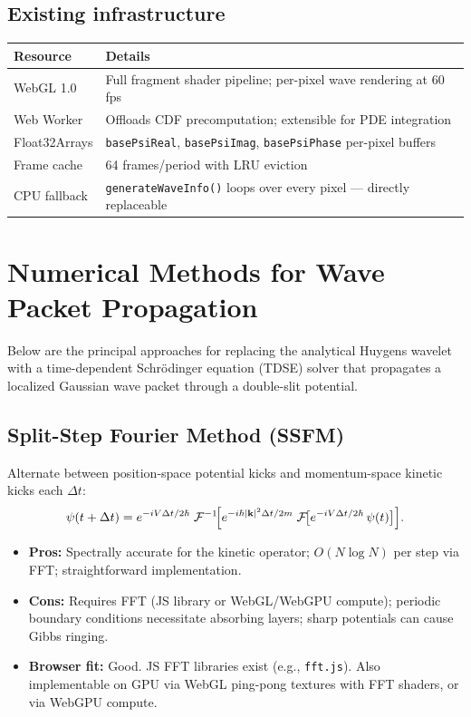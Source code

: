 \documentclass[11pt,a4paper]{article}
\begin{document}
\subsection{Existing infrastructure}
\begin{table}[h]
\centering
\begin{tabular}{@{}ll@{}}
\toprule
\textbf{Resource} & \textbf{Details} \\
\midrule
WebGL 1.0 & Full fragment shader pipeline; per-pixel wave rendering at 60\,fps \\
Web Worker & Offloads CDF precomputation; extensible for PDE integration \\
Float32Arrays & \texttt{basePsiReal}, \texttt{basePsiImag}, \texttt{basePsiPhase} per-pixel buffers \\
Frame cache & 64 frames/period with LRU eviction \\
CPU fallback & \texttt{generateWaveInfo()} loops over every pixel --- directly replaceable \\
\bottomrule
\end{tabular}
\end{table}


\section{Numerical Methods for Wave Packet Propagation}

Below are the principal approaches for replacing the analytical Huygens wavelet with a time-dependent Schr\"odinger equation (TDSE) solver that propagates a localized Gaussian wave packet through a double-slit potential.

\subsection{Split-Step Fourier Method (SSFM)}

Alternate between position-space potential kicks and momentum-space kinetic kicks each $\Delta t$:
\begin{equation}
  \psi(t + \Delta t)
  = e^{-iV\Delta t/2\hbar}\;
    \mathcal{F}^{-1}\!\Bigl[
      e^{-i\hbar|\mathbf{k}|^2\Delta t/2m}\;
      \mathcal{F}\!\bigl[
        e^{-iV\Delta t/2\hbar}\,\psi(t)
      \bigr]
    \Bigr].
\end{equation}

\begin{itemize}
  \item \textbf{Pros:} Spectrally accurate for the kinetic operator; $O(N\log N)$ per step via FFT; straightforward implementation.
  \item \textbf{Cons:} Requires FFT (JS library or WebGL/WebGPU compute); periodic boundary conditions necessitate absorbing layers; sharp potentials can cause Gibbs ringing.
  \item \textbf{Browser fit:} Good. JS FFT libraries exist (e.g., \texttt{fft.js}). Also implementable on GPU via WebGL ping-pong textures with FFT shaders, or via WebGPU compute.
\end{itemize}
\end{document}
